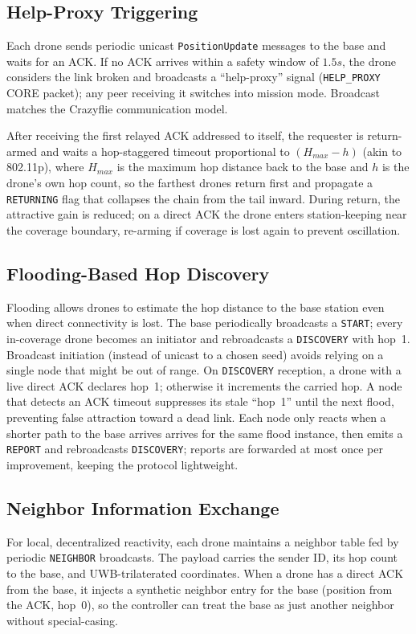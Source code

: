 \documentclass[conference]{IEEEtran}
\begin{document}
\subsection{Help-Proxy Triggering}
Each drone sends periodic unicast \texttt{PositionUpdate} messages to the base
and waits for an ACK. If no ACK arrives within a safety window of $1.5s$, the drone
considers the link broken and broadcasts a ``help-proxy'' signal
(\texttt{HELP\_PROXY} CORE packet); any peer receiving it switches into
mission mode. Broadcast matches the Crazyflie communication model.

After receiving the first relayed ACK addressed to itself, the requester is 
return-armed and waits a hop-staggered timeout proportional to $(H_{max}-h)$ 
(akin to 802.11p), where $H_{max}$ is the maximum hop distance back to the base 
and $h$ is the drone's own hop count, so the farthest drones return first and 
propagate a \texttt{RETURNING} flag that collapses the chain from the tail inward. 
During return, the attractive gain is reduced; on a direct ACK the drone enters 
station-keeping near the coverage boundary, re-arming if coverage is lost again 
to prevent oscillation.

\subsection{Flooding-Based Hop Discovery}
Flooding allows drones to estimate the hop distance to the base station even when
direct connectivity is lost. The base periodically broadcasts a
\texttt{START}; every in-coverage drone becomes an initiator and rebroadcasts
a \texttt{DISCOVERY} with hop~1. Broadcast initiation (instead of unicast to
a chosen seed) avoids relying on a single node that might be out of range. On
\texttt{DISCOVERY} reception, a drone with a live direct ACK declares hop~1;
otherwise it increments the carried hop. A node that detects an ACK timeout
suppresses its stale ``hop~1'' until the next flood, preventing false
attraction toward a dead link. Each node only reacts when a shorter path to 
the base arrives arrives for the same flood instance, then emits a \texttt{REPORT} 
and rebroadcasts \texttt{DISCOVERY}; reports are forwarded at most once per
improvement, keeping the protocol lightweight.

\subsection{Neighbor Information Exchange}
For local, decentralized reactivity, each drone maintains a neighbor table
fed by periodic \texttt{NEIGHBOR} broadcasts. The payload carries the sender
ID, its hop count to the base, and UWB-trilaterated coordinates. When a drone
has a direct ACK from the base, it injects a synthetic neighbor entry for
the base (position from the ACK, hop~0), so the controller can treat the
base as just another neighbor without special-casing.
\end{document}
